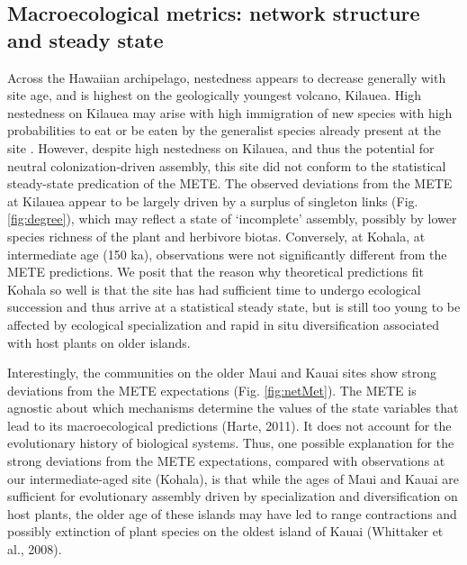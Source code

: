 \subsection{Macroecological metrics: network structure and steady
state}

Across the Hawaiian archipelago, nestedness appears to decrease
generally with site age, and is highest on the geologically youngest
volcano, Kilauea. High nestedness on Kilauea may arise with high
immigration of new species with high probabilities to eat or be eaten
by the generalist species already present at the site
\citep{bascompte2007}. However, despite high nestedness on Kilauea,
and thus the potential for neutral colonization-driven assembly, this
site did not conform to the statistical steady-state predication of
the METE. The observed deviations from the METE at Kilauea appear to
be largely driven by a surplus of singleton links
(Fig. \ref{fig:degree}), which may reflect a state of ‘incomplete’
assembly, possibly by lower species richness of the plant and
herbivore biotas. Conversely, at Kohala, at intermediate age (150 ka),
observations were not significantly different from the METE
predictions. We posit that the reason why theoretical predictions fit
Kohala so well is that the site has had sufficient time to undergo
ecological succession and thus arrive at a statistical steady state,
but is still too young to be affected by ecological specialization and
rapid in situ diversification associated with host plants on older
islands.

Interestingly, the communities on the older Maui and Kauai sites show
strong deviations from the METE expectations
(Fig. \ref{fig:netMet}). The METE is agnostic about which mechanisms
determine the values of the state variables that lead to its
macroecological predictions (Harte, 2011). It does not account for the
evolutionary history of biological systems. Thus, one possible
explanation for the strong deviations from the METE expectations,
compared with observations at our intermediate-aged site (Kohala), is
that while the ages of Maui and Kauai are sufficient for evolutionary
assembly driven by specialization and diversification on host plants,
the older age of these islands may have led to range contractions and
possibly extinction of plant species on the oldest island of Kauai
(Whittaker et al., 2008).


